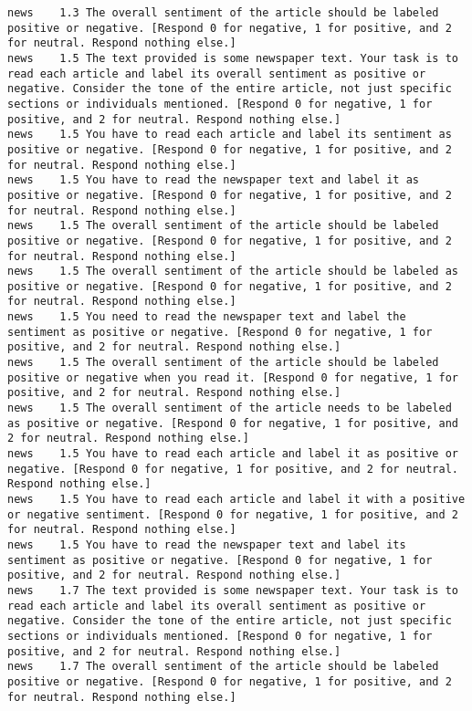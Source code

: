 \begin{lstlisting}[label=lst:promptvariants]
news	1.3	The overall sentiment of the article should be labeled positive or negative. [Respond 0 for negative, 1 for positive, and 2 for neutral. Respond nothing else.]
news	1.5	The text provided is some newspaper text. Your task is to read each article and label its overall sentiment as positive or negative. Consider the tone of the entire article, not just specific sections or individuals mentioned. [Respond 0 for negative, 1 for positive, and 2 for neutral. Respond nothing else.]
news	1.5	You have to read each article and label its sentiment as positive or negative. [Respond 0 for negative, 1 for positive, and 2 for neutral. Respond nothing else.]
news	1.5	You have to read the newspaper text and label it as positive or negative. [Respond 0 for negative, 1 for positive, and 2 for neutral. Respond nothing else.]
news	1.5	The overall sentiment of the article should be labeled positive or negative. [Respond 0 for negative, 1 for positive, and 2 for neutral. Respond nothing else.]
news	1.5	The overall sentiment of the article should be labeled as positive or negative. [Respond 0 for negative, 1 for positive, and 2 for neutral. Respond nothing else.]
news	1.5	You need to read the newspaper text and label the sentiment as positive or negative. [Respond 0 for negative, 1 for positive, and 2 for neutral. Respond nothing else.]
news	1.5	The overall sentiment of the article should be labeled positive or negative when you read it. [Respond 0 for negative, 1 for positive, and 2 for neutral. Respond nothing else.]
news	1.5	The overall sentiment of the article needs to be labeled as positive or negative. [Respond 0 for negative, 1 for positive, and 2 for neutral. Respond nothing else.]
news	1.5	You have to read each article and label it as positive or negative. [Respond 0 for negative, 1 for positive, and 2 for neutral. Respond nothing else.]
news	1.5	You have to read each article and label it with a positive or negative sentiment. [Respond 0 for negative, 1 for positive, and 2 for neutral. Respond nothing else.]
news	1.5	You have to read the newspaper text and label its sentiment as positive or negative. [Respond 0 for negative, 1 for positive, and 2 for neutral. Respond nothing else.]
news	1.7	The text provided is some newspaper text. Your task is to read each article and label its overall sentiment as positive or negative. Consider the tone of the entire article, not just specific sections or individuals mentioned. [Respond 0 for negative, 1 for positive, and 2 for neutral. Respond nothing else.]
news	1.7	The overall sentiment of the article should be labeled positive or negative. [Respond 0 for negative, 1 for positive, and 2 for neutral. Respond nothing else.]

\end{lstlisting}
